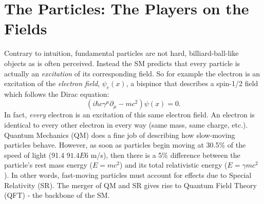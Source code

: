 

\section{The Particles: The Players on the Fields}

Contrary to intuition, fundamental particles are not hard, billiard-ball-like objects as is often perceived.
Instead the SM predicts that every particle is actually an \emph{excitation} of its corresponding field.
So for example the electron is an excitation of the \emph{electron field}, $\psi_{e}(x)$, a bispinor that describes a spin-1/2 field which follows the Dirac equation: 
\begin{equation*}
    (i\hbar c \gamma^{\mu}{\partial}_{\mu} 
    - mc^{2})\psi(x) = 0.
\end{equation*}
In fact, \emph{every} electron is an excitation of this same electron field. 
An electron is identical to every other electron in every way (same mass, same charge, etc.).
Quantum Mechanics (QM) does a fine job of describing how slow-moving particles behave.
However, as soon as particles begin moving at 30.5\% of the speed of light (91.4 $91.4 E6$ m/s), then there is a 5\% difference between the particle's rest mass energy ($E = mc^2$) and its total relativistic energy ($E = \gamma mc^2$).
In other words, fast-moving particles must account for effects due to Special Relativity (SR).
The merger of QM and SR gives rise to Quantum Field Theory (QFT) - the backbone of the SM.

